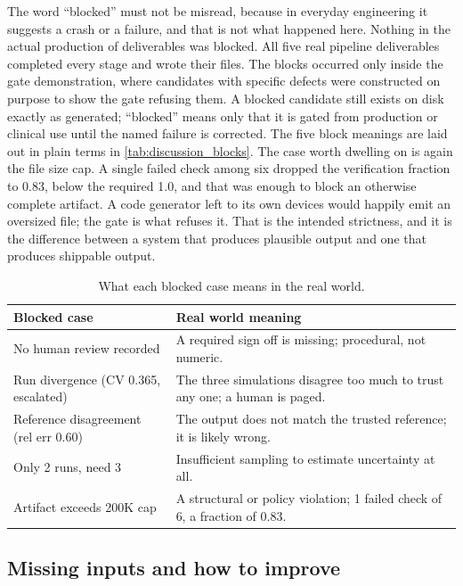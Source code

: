 The word ``blocked'' must not be misread, because in everyday engineering it
suggests a crash or a failure, and that is not what happened here. Nothing in the
actual production of deliverables was blocked. All five real pipeline deliverables
completed every stage and wrote their files. The blocks occurred only inside the
gate demonstration, where candidates with specific defects were constructed on
purpose to show the gate refusing them. A blocked candidate still exists on disk
exactly as generated; ``blocked'' means only that it is gated from production or
clinical use until the named failure is corrected. The five block meanings are
laid out in plain terms in \autoref{tab:discussion_blocks}. The case worth
dwelling on is again the file size cap. A single failed check among six dropped
the verification fraction to 0.83, below the required 1.0, and that was enough to
block an otherwise complete artifact. A code generator left to its own devices
would happily emit an oversized file; the gate is what refuses it. That is the
intended strictness, and it is the difference between a system that produces
plausible output and one that produces shippable output.

\begin{table}[H]
\caption{What each blocked case means in the real world.}
\label{tab:discussion_blocks}
\centering
\begin{tabularx}{\textwidth}{L{5.6cm} >{\raggedright\arraybackslash}X}
\toprule
\textbf{Blocked case} & \textbf{Real world meaning} \\
\midrule
  No human review recorded & A required sign off is missing; procedural, not numeric. \\
  Run divergence (CV 0.365, escalated) & The three simulations disagree too much to trust any one; a human is paged. \\
  Reference disagreement (rel err 0.60) & The output does not match the trusted reference; it is likely wrong. \\
  Only 2 runs, need 3 & Insufficient sampling to estimate uncertainty at all. \\
  Artifact exceeds 200K cap & A structural or policy violation; 1 failed check of 6, a fraction of 0.83. \\
\bottomrule
\end{tabularx}
\end{table}

\subsection{Missing inputs and how to improve}

